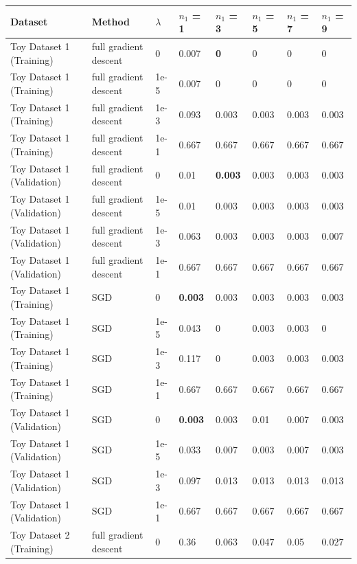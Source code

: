 \documentclass[10pt]{article}
\begin{document}
\begin{table}
\centering
\begin{tabular}{llllllll}
\toprule
Dataset & Method & $\lambda$ & $n_1$ = \bf{1} & $n_1$ =  \bf{3} & $n_1$ =  \bf{5} & $n_1$ =  \bf{7} & $n_1$ =  \bf{9} \\
\midrule
Toy Dataset 1 (Training) & full gradient descent & 0 &     0.007 & \bf{0}     & 0     & 0     & 0     \\
Toy Dataset 1 (Training) & full gradient descent & 1e-5 &   0.007 & 0     & 0     & 0     & 0     \\
Toy Dataset 1 (Training) & full gradient descent & 1e-3 &  0.093 & 0.003 & 0.003 & 0.003 & 0.003 \\
Toy Dataset 1 (Training) & full gradient descent & 1e-1 &  0.667 & 0.667 & 0.667 & 0.667 & 0.667 \\
\midrule
Toy Dataset 1 (Validation) & full gradient descent & 0 &      0.01  & \bf{0.003} & 0.003 & 0.003 & 0.003 \\
Toy Dataset 1 (Validation) & full gradient descent & 1e-5 &   0.01  & 0.003 & 0.003 & 0.003 & 0.003 \\
Toy Dataset 1 (Validation) & full gradient descent & 1e-3 &  0.063 & 0.003 & 0.003 & 0.003 & 0.007 \\
Toy Dataset 1 (Validation) & full gradient descent & 1e-1 &   0.667 & 0.667 & 0.667 & 0.667 & 0.667 \\
\midrule
Toy Dataset 1 (Training) & SGD & 0 &       \bf{0.003} & 0.003 & 0.003 & 0.003 & 0.003 \\
Toy Dataset 1 (Training) & SGD & 1e-5 &   0.043 & 0     & 0.003 & 0.003 & 0     \\
Toy Dataset 1 (Training) & SGD & 1e-3 &   0.117 & 0     & 0.003 & 0.003 & 0.003 \\
Toy Dataset 1 (Training) & SGD & 1e-1 &   0.667 & 0.667 & 0.667 & 0.667 & 0.667 \\
\midrule
Toy Dataset 1 (Validation) & SGD & 0 &       \bf{0.003} & 0.003 & 0.01  & 0.007 & 0.003 \\
Toy Dataset 1 (Validation) & SGD & 1e-5 &   0.033 & 0.007 & 0.003 & 0.007 & 0.003 \\
Toy Dataset 1 (Validation) & SGD & 1e-3 &   0.097 & 0.013 & 0.013 & 0.013 & 0.013 \\
Toy Dataset 1 (Validation) & SGD & 1e-1 &  0.667 & 0.667 & 0.667 & 0.667 & 0.667 \\
\midrule
Toy Dataset 2 (Training) & full gradient descent & 0 &      0.36  & 0.063 & 0.047 & 0.05  & 0.027 \\

\end{tabular}
\end{table}
\end{document}
